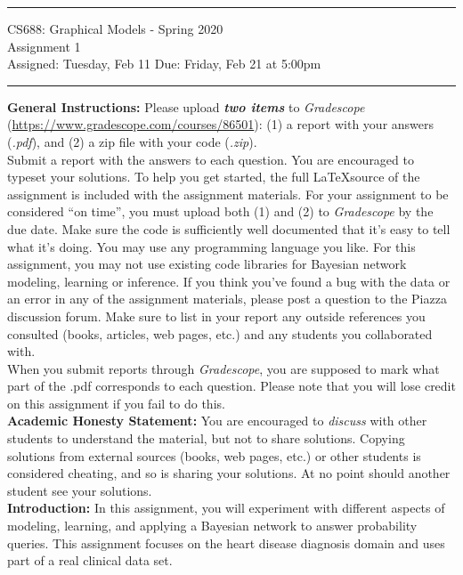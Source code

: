 \documentclass[11pt]{article}
\begin{document}
{\centering
  \rule{6.3in}{2pt}
  \vspace{1em}
  {\Large
    CS688: Graphical Models - Spring 2020 \\
    Assignment 1\\
  }
  \vspace{1em}
  Assigned: Tuesday, Feb 11 Due: Friday, Feb 21 at 5:00pm \\
  \vspace{0.1em}
  \rule{6.3in}{1.5pt}
}
\vspace{1pc}


\textbf{General Instructions:} Please upload {\em\bf two items} to \textit{Gradescope} (\url{https://www.gradescope.com/courses/86501}): (1) a report with your answers (\textit{.pdf}), and (2) a zip file with your code (\textit{.zip}).\\
Submit a report with the answers to each question. You are encouraged to typeset your solutions. To help you get started, the full \LaTeX source of the assignment is included with the assignment materials. For your assignment to be considered ``on time'', you must upload both (1) and (2) to \textit{Gradescope} by the due date. Make sure the code is sufficiently well documented that it's easy to tell what it's doing. You may use any programming language you like. For this assignment, you may not use existing code libraries for Bayesian network modeling, learning or inference. If you think you've found a bug with the data or an error in any of the assignment materials, please post a question to the Piazza discussion forum. Make sure to list in your report any outside references you consulted (books, articles, web pages, etc.) and any students you collaborated with.\\
When you submit reports through \textit{Gradescope}, you are supposed to mark what part of the .pdf corresponds to each question. Please note that you will lose credit on this assignment if you fail to do this. \\

\textbf{Academic Honesty Statement:} You are encouraged to {\it discuss} with other students to understand the material, but not to share solutions.
Copying solutions from external sources (books, web pages, etc.) or other students is considered cheating, and so is sharing your solutions. At no point should another student see your solutions. \\

\textbf{Introduction:} In this assignment, you will experiment with different aspects of modeling, learning, and applying a Bayesian network to answer probability queries. This assignment focuses on the heart disease diagnosis domain and uses part of a real clinical data set. \\
\end{document}
